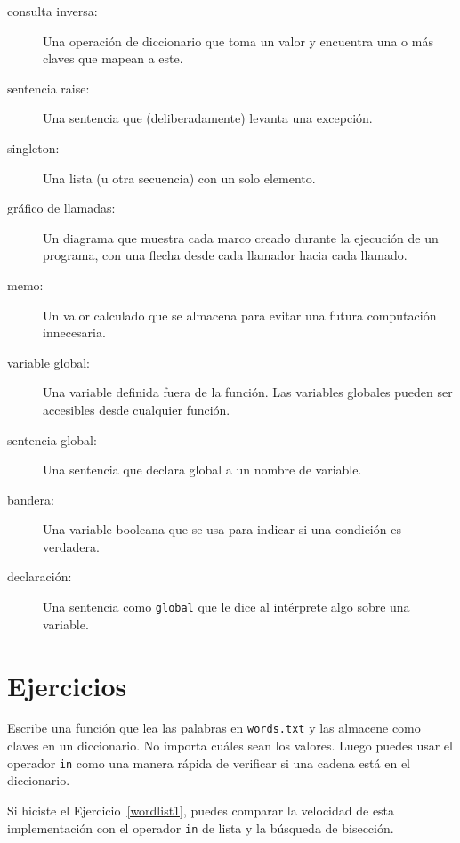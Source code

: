 \documentclass[10pt]{book}
\begin{document}
\begin{description}
\item[consulta inversa:] Una operación de diccionario que toma un valor y encuentra
una o más claves que mapean a este.

\item[sentencia raise:]  Una sentencia que (deliberadamente) levanta una excepción.

\item[singleton:] Una lista (u otra secuencia) con un solo elemento.

\item[gráfico de llamadas:] Un diagrama que muestra cada marco creado durante
la ejecución de un programa, con una flecha desde cada llamador
hacia cada llamado.

\item[memo:] Un valor calculado que se almacena para evitar una futura
computación innecesaria.

\item[variable global:]  Una variable definida fuera de la función. Las
variables globales pueden ser accesibles desde cualquier función.

\item[sentencia global:]  Una sentencia que declara global a un nombre
de variable.

\item[bandera:] Una variable booleana que se usa para indicar si una condición
es verdadera.

\item[declaración:] Una sentencia como {\tt global} que le dice al
intérprete algo sobre una variable.

\end{description}


\section{Ejercicios}

\begin{exercise}
\label{wordlist2}

Escribe una función que lea las palabras en {\tt words.txt} y
las almacene como claves en un diccionario.  No importa cuáles sean
los valores.  Luego puedes usar el operador {\tt in}
como una manera rápida de verificar si una cadena está en
el diccionario.

Si hiciste el Ejercicio~\ref{wordlist1}, puedes comparar la velocidad
de esta implementación con el operador {\tt in} de lista y la
búsqueda de bisección.

\end{exercise}
\end{document}
